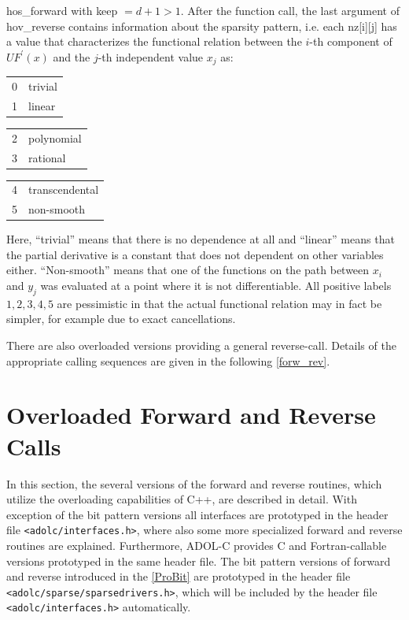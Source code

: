 \documentclass[11pt,twoside]{article}
\begin{document}
{\sf hos\_forward} with {\sf keep} $=d+1>1$. 
After the function call, the last argument of {\sf hov\_reverse} 
contains information about the sparsity pattern, i.e. each {\sf nz[i][j]}
has a value that characterizes the functional relation between the
$i$-th component of $UF^\prime(x)$ and the $j$-th independent value
$x_j$ as:
\begin{center}
\begin{tabular}{ll}
 0 & trivial \\
 1 & linear 
\end{tabular} \hspace*{4ex}
\begin{tabular}{ll}
 2 & polynomial\\
 3 & rational
\end{tabular} \hspace*{4ex}
\begin{tabular}{ll}
 4 & transcendental\\
 5 & non-smooth
\end{tabular}
\end{center}
Here, ``trivial'' means that there is no dependence at all and ``linear'' means
that the partial derivative is a constant that
does not dependent on other variables either. ``Non-smooth'' means that one of
the functions on the path between $x_i$ and $y_j$ was evaluated at a point 
where it is not differentiable.  All positive labels
$1, 2, 3, 4, 5$ are pessimistic in that the actual functional relation may
in fact be simpler, for example due to exact cancellations.  

There are also overloaded versions providing a general {\sf reverse}-call.
Details of the appropriate calling sequences are given in the following \autoref{forw_rev}.



%
\section{Overloaded Forward and Reverse Calls}
\label{forw_rev}
%
In this section, the several versions of the {\sf forward} and 
{\sf reverse} routines, which utilize the overloading capabilities
of C++, are described in detail. With exception of the bit pattern
versions all interfaces are prototyped in the header file 
\verb=<adolc/interfaces.h>=, where also some more specialized {\sf forward}
and {\sf reverse} routines are explained. Furthermore, \mbox{ADOL-C} provides
C and Fortran-callable versions prototyped in the same header file.
The bit pattern versions of {\sf forward} and {\sf reverse} introduced
in the \autoref{ProBit} are prototyped in the header file
\verb=<adolc/sparse/sparsedrivers.h>=, which will be included by the header 
file \verb=<adolc/interfaces.h>= automatically.
%
\end{document}
